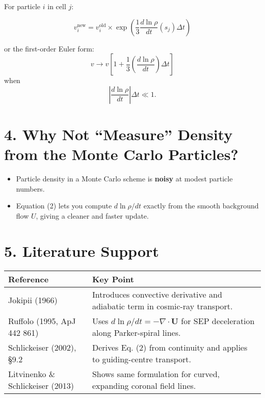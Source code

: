 For particle $i$ in cell $j$:

\begin{equation}
\boxed{\displaystyle
v_i^{\text{new}} =
v_i^{\text{old}} \times \exp\left( \frac{1}{3} \frac{d\ln\rho}{dt}(s_j) \Delta t \right)
}
\tag{3}
\end{equation}

or the first-order Euler form:
\[
v \to v \left[ 1 + \frac{1}{3} \left( \frac{d\ln\rho}{dt} \right) \Delta t \right]
\]
when
\[
\left| \frac{d\ln\rho}{dt} \right| \Delta t \ll 1.
\]

\hrulefill

\section*{4. Why Not ``Measure'' Density from the Monte Carlo Particles?}

\begin{itemize}
    \item Particle density in a Monte Carlo scheme is \textbf{noisy} at modest particle numbers.
    \item Equation (2) lets you compute $d\ln\rho/dt$ exactly from the smooth background flow $U$, giving a cleaner and faster update.
\end{itemize}

\hrulefill

\section*{5. Literature Support}

\begin{center}
\begin{tabular}{@{}ll@{}}
\toprule
\textbf{Reference} & \textbf{Key Point} \\
\midrule
Jokipii (1966) & Introduces convective derivative and adiabatic term in cosmic-ray transport. \\
Ruffolo (1995, ApJ 442 861) & Uses $d\ln\rho/dt = -\nabla \cdot \mathbf{U}$ for SEP deceleration along Parker-spiral lines. \\
Schlickeiser (2002), \S9.2 & Derives Eq. (2) from continuity and applies to guiding-centre transport. \\
Litvinenko \& Schlickeiser (2013) & Shows same formulation for curved, expanding coronal field lines. \\
\bottomrule
\end{tabular}
\end{center}


